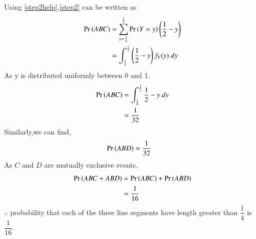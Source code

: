 \documentclass[journal,12pt,twocolumn]{IEEEtran}
\begin{document}
     Using \eqref{step2help},\eqref{step2} can be written as
     \begin{align}
    \Pr\left(ABC\right)&=\sum_{y=\frac{1}{4}}^{\frac{1}{2}}\Pr\left(Y=y\right)\left(\frac{1}{2}-y\right)\\
    &=\int_{\frac{1}{4}}^{\frac{1}{2}}\left(\frac{1}{2}-y\right) f_{Y}(y)~dy
    \end{align}
    As y is distributed uniformly between 0 and 1.
    \begin{align}
   \Pr\left(ABC\right) &=\int_{\frac{1}{4}}^{\frac{1}{2}}\frac{1}{2}-y~dy\\
    &=\dfrac{1}{32}
\end{align}
Similarly,we can find,
\begin{align}
    \Pr\left(ABD\right)&=\dfrac{1}{32}
\end{align}
As $C$ and $D$ are mutually exclusive events.
\begin{align}
    \Pr\left(ABC+ABD\right)&=\Pr\left(ABC\right)+\Pr\left(ABD\right)\\
    &=\dfrac{1}{16} 
\end{align}
$\therefore$ probability that each of the three line segments have length greater than $\dfrac{1}{4}$  is  $\dfrac{1}{16}$.
\end{document}
